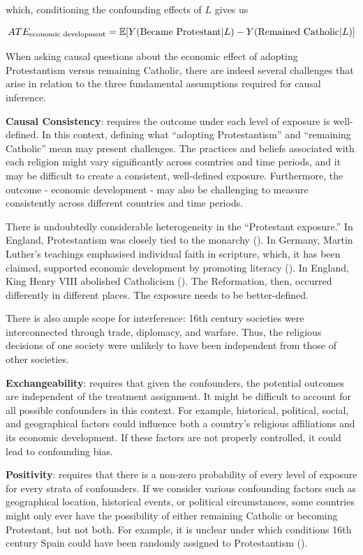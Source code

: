 \documentclass[
  singlecolumn,
  9pt]{article}
\begin{document}
which, conditioning the confounding effects of \(L\) gives us

\[ATE_{\textnormal{economic~development}} = \mathbb{E}[Y(\textnormal{Became~Protestant}|L) - Y(\textnormal{Remained~Catholic}|L)]\]

When asking causal questions about the economic effect of adopting
Protestantism versus remaining Catholic, there are indeed several
challenges that arise in relation to the three fundamental assumptions
required for causal inference.

\textbf{Causal Consistency}: requires the outcome under each level of
exposure is well-defined. In this context, defining what ``adopting
Protestantism'' and ``remaining Catholic'' mean may present challenges.
The practices and beliefs associated with each religion might vary
significantly across countries and time periods, and it may be difficult
to create a consistent, well-defined exposure. Furthermore, the outcome
- economic development - may also be challenging to measure consistently
across different countries and time periods.

There is undoubtedly considerable heterogeneity in the ``Protestant
exposure.'' In England, Protestantism was closely tied to the monarchy
(). In Germany, Martin
Luther's teachings emphasised individual faith in scripture, which, it
has been claimed, supported economic development by promoting literacy
(). In England,
King Henry VIII abolished Catholicism
(). The Reformation, then,
occurred differently in different places. The exposure needs to be
better-defined.

There is also ample scope for interference: 16th century societies were
interconnected through trade, diplomacy, and warfare. Thus, the
religious decisions of one society were unlikely to have been
independent from those of other societies.

\textbf{Exchangeability}: requires that given the confounders, the
potential outcomes are independent of the treatment assignment. It might
be difficult to account for all possible confounders in this context.
For example, historical, political, social, and geographical factors
could influence both a country's religious affiliations and its economic
development. If these factors are not properly controlled, it could lead
to confounding bias.

\textbf{Positivity}: requires that there is a non-zero probability of
every level of exposure for every strata of confounders. If we consider
various confounding factors such as geographical location, historical
events, or political circumstances, some countries might only ever have
the possibility of either remaining Catholic or becoming Protestant, but
not both. For example, it is unclear under which conditions 16th century
Spain could have been randomly assigned to Protestantism
().
\end{document}
